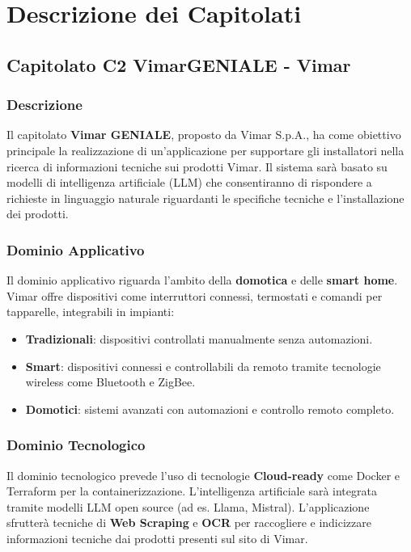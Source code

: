 \documentclass{article}
\begin{document}
\section{Descrizione dei Capitolati}

\subsection{Capitolato C2 VimarGENIALE - Vimar}

\subsubsection{Descrizione}

Il capitolato \textbf{Vimar GENIALE}, proposto da Vimar S.p.A., ha come obiettivo 
principale la realizzazione di un'applicazione per supportare gli installatori nella 
ricerca di informazioni tecniche sui prodotti Vimar. Il sistema sarà basato su modelli 
di intelligenza artificiale (LLM) che consentiranno di 
rispondere a richieste in linguaggio naturale riguardanti le specifiche tecniche e 
l'installazione dei prodotti.

\subsubsection{Dominio Applicativo}

Il dominio applicativo riguarda l'ambito della \textbf{domotica} e delle \textbf{smart home}. 
Vimar offre dispositivi come interruttori connessi, termostati e comandi per tapparelle, 
integrabili in impianti:
\begin{itemize}
    \item \textbf{Tradizionali}: dispositivi controllati manualmente senza automazioni.
    \item \textbf{Smart}: dispositivi connessi e controllabili da remoto tramite 
    tecnologie wireless come Bluetooth e ZigBee.
    \item \textbf{Domotici}: sistemi avanzati con automazioni e controllo remoto completo.
\end{itemize}

\subsubsection{Dominio Tecnologico}

Il dominio tecnologico prevede l'uso di tecnologie \textbf{Cloud-ready} 
come Docker e Terraform per la containerizzazione. 
L'intelligenza artificiale sarà integrata tramite modelli LLM open source (ad es. Llama, Mistral). 
L'applicazione sfrutterà tecniche di \textbf{Web Scraping} e \textbf{OCR} per raccogliere e indicizzare 
informazioni tecniche dai prodotti presenti sul sito di Vimar.
\end{document}
